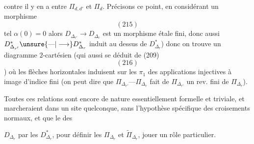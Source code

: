 contre il y en a entre $\Pi_{d,d'}$ et $\Pi_d$.
Précisons ce point, en considérant un
morphisme
\[
(215)
\]
tel  $\alpha(0)=0$
alors $D_{\Delta_{r'}}\longrightarrow D_{\Delta_r}$ est un morphisme
étale fini, donc aussi $D^*_{\Delta_{r'}}\unsure{\text{---}|\longrightarrow}D^*_{\Delta_r}$ induit
au dessus de $D^*_{\Delta_r}$) donc on trouve
un diagramme $2$-cartésien (qui 
 aussi se déduit de (209)
\[
(216)
\]
)
où les flèches horizontales induisent sur
les $\pi_1$ des applications injectives à
image d'indice fini (on peut dire que
$\Pi_{\Delta_{r'}}\text{---}\Pi_{\Delta_r}$ fait de $\Pi_{\Delta_{r'}}$ un
rev. fini de $\Pi_{\Delta_r}$).

Toutes ces relations sont encore de
nature essentiellement formelle et triviale,
et marcheraient dans un site quelconque,
sans l'hypothèse spécifique des croisements
normaux, et  que le  des

$D_{\Delta_r}$ par les $D^*_{\Delta_r}$, pour définir les
$\Pi_{\Delta_r}$ et $\widetilde\Pi_{\Delta_r}$, 
jouer un rôle particulier.


